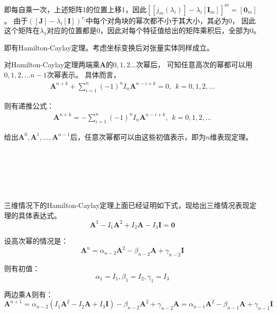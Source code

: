 \documentclass[UTF8,zihao=5]{ctexart}
\newcommand{\bm}[1]{{\mathbf{#1}}}
\begin{document}
即每自乘一次，上述矩阵1的位置上移1，因此$\left[[j_m(\lambda_i)]-\lambda_i[\bm{I}_m]\right]^m=[\bm{0}_m]$。
由于$([\bm{J}]-\lambda_i[\bm{I}])^{r_i}$中每个对角块的幂次都不小于其大小，其必为0，
因此这个矩阵在$\lambda_1$对应的位置都是0，因此对每个特征值给出的矩阵乘积后，全部为0。

即有Hamilton-Caylay定理。考虑坐标变换后对张量实体同样成立。

对Hamilton-Caylay定理两端乘$\bm{A}$的$0,1,2...$次幂后，
可知任意高次的幂都可以用$0,1,2,...n-1$次幂表示。
具体而言，
\begin{equation}
    \begin{aligned}
        \bm{A}^{n+k}+\sum_{i=1}^n{(-1)^nI_n\bm{A}^{n-i+k}}=0,\ \ k=0,1,2,...
    \end{aligned}
\end{equation}

则有递推公式：
\begin{equation}
    \begin{aligned}
        \bm{A}^{n+k}=-\sum_{i=1}^n{(-1)^nI_n\bm{A}^{n-i+k}},\ \ k=0,1,2,...
    \end{aligned}
\end{equation}

给出$\bm{A}^0,\bm{A}^1,\dots,\bm{A}^{n-1}$后，任意次幂都可以由这些初值表示，即为$n$维表现定理。

\

\

\


三维情况下的Hamilton-Caylay定理上面已经证明如下式，现给出三维情况表现定理的具体表达式。
\begin{equation}
    \bm{A}^3-I_1\bm{A}^2+I_2\bm{A}-I_3\bm{I}=\bm{0}
    \label{eq:HLTheorem3D}
\end{equation}

设高次幂的情况是：
\begin{equation}
    \bm{A}^n=\alpha_{n-2}\bm{A}^2-\beta_{n-2}\bm{A}+\gamma_{n-2}\bm{I}
\end{equation}

则有初值：
\begin{equation}
    \alpha_1=I_1,\beta_1=I_2,\gamma_1=I_3
\end{equation}

两边乘$\bm{A}$则有：
\begin{equation}
    \bm{A}^{n+1}=\alpha_{n-2}(I_1\bm{A}^2-I_2\bm{A}+I_3\bm{I})
    -\beta_{n-2}\bm{A}^2+\gamma_{n-2}\bm{A}
    =\alpha_{n-1}\bm{A}^2-\beta_{n-1}\bm{A}+\gamma_{n-1}\bm{I}
\end{equation}
\end{document}
